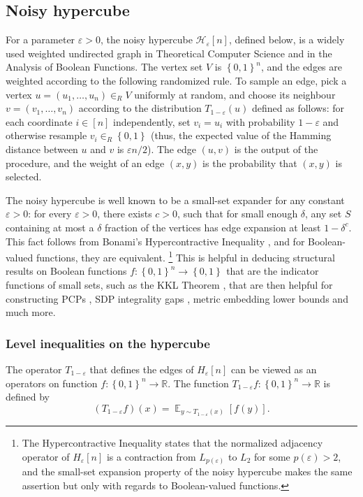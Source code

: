 \documentclass{toc}
\newcommand\set[1]{{\left\{ #1 \right\}}}
\newcommand\Expect[2]{{\mathop{\mathbb{E}}_{#1}\left[ {#2} \right]}}
\newcommand\power[1]{\set{0,1}^{#1}}
\newcommand\eps{\varepsilon}
\begin{document}
\subsection{Noisy hypercube}
For a parameter $\eps>0$, the noisy hypercube
$\mathcal{H}_\eps[n]$,   %
defined below, is a widely used weighted undirected graph in Theoretical Computer Science and
in the  %
Analysis of Boolean Functions.
%
%
%
%
%
%
The vertex set $V$ is $\power{n}$, and the edges are weighted according to the
following %
%
randomized rule.  %
To sample an edge, pick a vertex %
$u =(u_1,\dots,u_n)\in_R V$ %
uniformly at random, and choose its neighbour %
$v=(v_1,\dots,v_n)$  %
according to the distribution $T_{1-\eps}(u)$
defined as follows:  %
for each coordinate $i\in [n]$ independently,
set $v_i = u_i$ with probability $1-\eps$ and otherwise resample $v_i\in_R \power{}$
(thus, %
the expected value of the  %
Hamming distance between $u$ and $v$ is $\eps n/2$).
The edge $(u,v)$ is the output of the %
procedure,  %
and the weight of an edge $(x,y)$ is the probability %
%
that $(x,y)$ is selected.  %

The noisy hypercube is well known to be a small-set expander for any constant
$\eps>0$: for every $\eps>0$, there exists
$c>0$, such that for small enough $\delta$, any set $S$ containing at most
a  %
$\delta$ fraction of the vertices has edge
expansion at least $1-\delta^c$. This fact
%
follows from  %
%
%
%
Bonami's   %
Hypercontractive Inequality
%
%
\cite{Bonami,Beckner,Gross},   %
and %
%
for Boolean-valued functions, they are equivalent.%
%
%
%
\footnote{%
The Hypercontractive Inequality states that the normalized adjacency operator
of $H_{\eps}[n]$ is a contraction from $L_{p(\eps)}$ to $L_2$ for some $p(\eps)>2$,
and the small-set expansion property
of the noisy hypercube  %
makes the same assertion but only with regards
to Boolean-valued functions.%
%
%
} This is helpful in deducing
structural results on Boolean %
functions   %
$f\colon\power{n}\to\power{}$ that are
the indicator functions of small sets, such as the KKL Theorem \cite{KKL},
that are then helpful for constructing PCPs \cite{Has01,DS05,KKMO07,DinurMosselRegev},
SDP integrality gaps \cite{FS2002,Rag2008}, metric embedding lower
bounds \cite{KhotVishnoi,KN} and much more.


%
%
\subsubsection{Level inequalities on the hypercube}   %
The operator $T_{1-\eps}$ that defines the edges of $H_{\eps}[n]$ can be viewed as an operators on function $f\colon\power{n}\to\mathbb{R}$.
The function $T_{1-\eps} f\colon \power{n}\to\mathbb{R}$ is defined by
\[
(T_{1-\eps} f)(x) = \Expect{y\sim T_{1-\eps}(x)}{f(y)}.
\]
\end{document}
